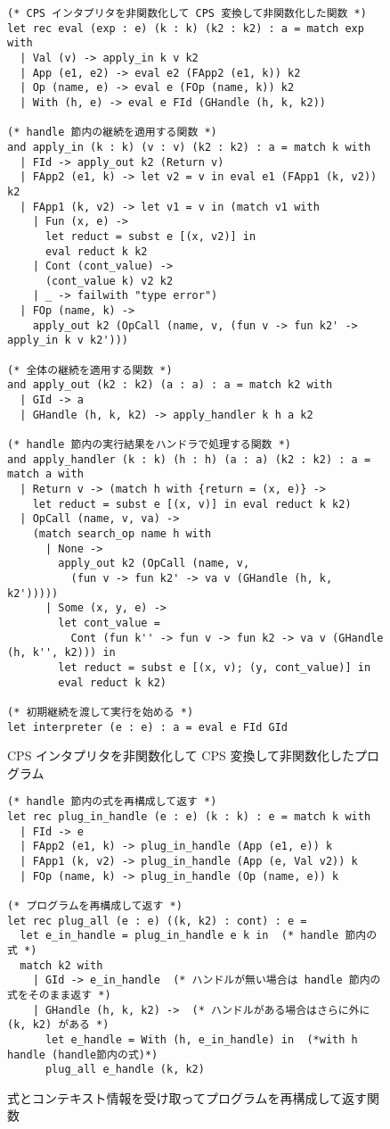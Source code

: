 \begin{figure}
\begin{verbatim}
(* CPS インタプリタを非関数化して CPS 変換して非関数化した関数 *)
let rec eval (exp : e) (k : k) (k2 : k2) : a = match exp with
  | Val (v) -> apply_in k v k2
  | App (e1, e2) -> eval e2 (FApp2 (e1, k)) k2
  | Op (name, e) -> eval e (FOp (name, k)) k2
  | With (h, e) -> eval e FId (GHandle (h, k, k2))

(* handle 節内の継続を適用する関数 *)
and apply_in (k : k) (v : v) (k2 : k2) : a = match k with
  | FId -> apply_out k2 (Return v)
  | FApp2 (e1, k) -> let v2 = v in eval e1 (FApp1 (k, v2)) k2
  | FApp1 (k, v2) -> let v1 = v in (match v1 with
    | Fun (x, e) ->
      let reduct = subst e [(x, v2)] in
      eval reduct k k2
    | Cont (cont_value) ->
      (cont_value k) v2 k2
    | _ -> failwith "type error")
  | FOp (name, k) ->
    apply_out k2 (OpCall (name, v, (fun v -> fun k2' -> apply_in k v k2')))

(* 全体の継続を適用する関数 *)
and apply_out (k2 : k2) (a : a) : a = match k2 with
  | GId -> a
  | GHandle (h, k, k2) -> apply_handler k h a k2

(* handle 節内の実行結果をハンドラで処理する関数 *)
and apply_handler (k : k) (h : h) (a : a) (k2 : k2) : a = match a with
  | Return v -> (match h with {return = (x, e)} ->
    let reduct = subst e [(x, v)] in eval reduct k k2)
  | OpCall (name, v, va) ->
    (match search_op name h with
      | None ->
        apply_out k2 (OpCall (name, v,
          (fun v -> fun k2' -> va v (GHandle (h, k, k2')))))
      | Some (x, y, e) ->
        let cont_value =
          Cont (fun k'' -> fun v -> fun k2 -> va v (GHandle (h, k'', k2))) in
        let reduct = subst e [(x, v); (y, cont_value)] in
        eval reduct k k2)

(* 初期継続を渡して実行を始める *)
let interpreter (e : e) : a = eval e FId GId
\end{verbatim}
\caption{CPS インタプリタを非関数化して CPS 変換して非関数化したプログラム}
\label{figure:4defun}
\end{figure}

\begin{figure}
\begin{verbatim}
(* handle 節内の式を再構成して返す *)
let rec plug_in_handle (e : e) (k : k) : e = match k with
  | FId -> e
  | FApp2 (e1, k) -> plug_in_handle (App (e1, e)) k
  | FApp1 (k, v2) -> plug_in_handle (App (e, Val v2)) k
  | FOp (name, k) -> plug_in_handle (Op (name, e)) k

(* プログラムを再構成して返す *)
let rec plug_all (e : e) ((k, k2) : cont) : e =
  let e_in_handle = plug_in_handle e k in  (* handle 節内の式 *)
  match k2 with
    | GId -> e_in_handle  (* ハンドルが無い場合は handle 節内の式をそのまま返す *)
    | GHandle (h, k, k2) ->  (* ハンドルがある場合はさらに外に (k, k2) がある *)
      let e_handle = With (h, e_in_handle) in  (*with h handle (handle節内の式)*)
      plug_all e_handle (k, k2)
\end{verbatim}
\caption{式とコンテキスト情報を受け取ってプログラムを再構成して返す関数}
\label{figure:plug_all}
\end{figure}
